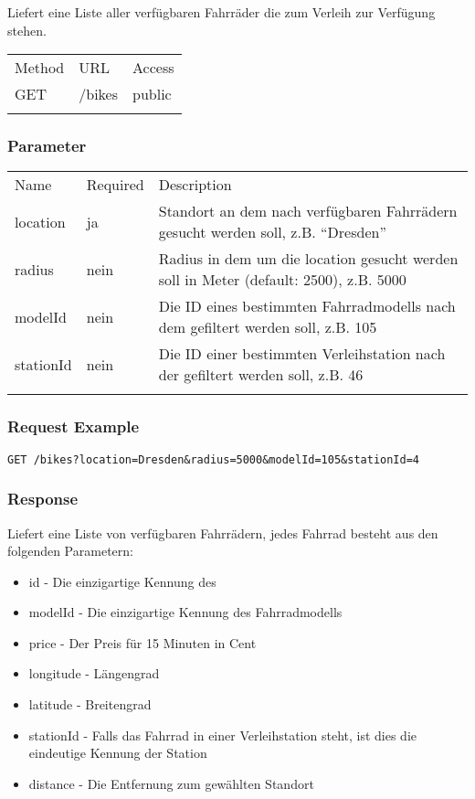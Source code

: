 Liefert eine Liste aller verfügbaren Fahrräder die zum Verleih zur
Verfügung stehen.

\begin{longtable}[c]{@{}lll@{}}
\toprule\addlinespace
Method & URL & Access
\\\addlinespace
\midrule\endhead
GET & /bikes & public
\\\addlinespace
\bottomrule
\end{longtable}

\subsubsection{Parameter}\label{parameter}

\begin{longtable}[c]{@{}lll@{}}
\toprule\addlinespace
Name & Required & Description
\\\addlinespace
\midrule\endhead
location & ja & Standort an dem nach verfügbaren Fahrrädern gesucht werden soll, z.B. ``Dresden''
\\\addlinespace
radius & nein & Radius in dem um die location gesucht werden soll in Meter (default: 2500), z.B. 5000
\\\addlinespace
modelId & nein & Die ID eines bestimmten Fahrradmodells nach dem gefiltert werden soll, z.B. 105
\\\addlinespace
stationId & nein & Die ID einer bestimmten Verleihstation nach der gefiltert werden soll, z.B. 46
\\\addlinespace
\bottomrule
\end{longtable}

\subsubsection{Request Example}\label{request-example}

\begin{verbatim}
GET /bikes?location=Dresden&radius=5000&modelId=105&stationId=4
\end{verbatim}

\subsubsection{Response}\label{response}

Liefert eine Liste von verfügbaren Fahrrädern, jedes Fahrrad besteht aus
den folgenden Parametern: 
\begin{itemize}
\item id - Die einzigartige Kennung des
\item modelId - Die einzigartige Kennung des Fahrradmodells
\item price - Der Preis für 15 Minuten in Cent
\item longitude - Längengrad
\item latitude - Breitengrad
\item stationId - Falls das Fahrrad in einer Verleihstation steht, ist dies die eindeutige Kennung der Station
\item  distance - Die Entfernung zum gewählten Standort
\end{itemize}

